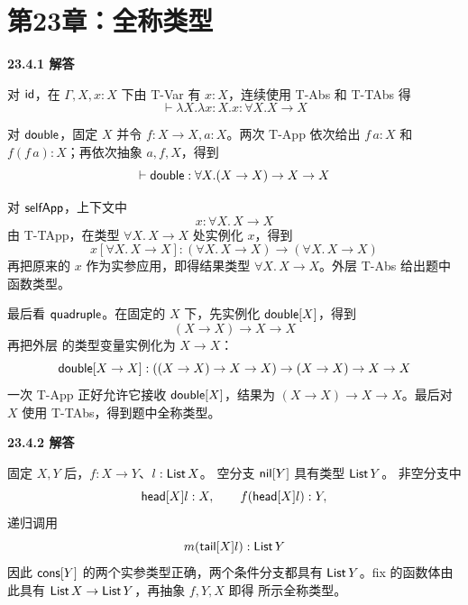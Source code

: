 \newpage
\section*{第23章：全称类型}

\begin{taplsolutionentrybox}
\label{sol:translator:23.4.1}
\textbf{23.4.1 解答}

对 \(\mathsf{id}\)，在 \(\Gamma,X,x:X\) 下由 T-Var 有
\(x:X\)，连续使用 T-Abs 和 T-TAbs 得
\[
\vdash\lambda X.\lambda x:X.x:\forall X.X\to X
\]

对 \(\mathsf{double}\)，固定 \(X\) 并令
\(f:X\to X,a:X\)。两次 T-App 依次给出
\(f\,a:X\) 和 \(f(f\,a):X\)；再依次抽象 \(a,f,X\)，得到
\[
\vdash\mathsf{double}:
\forall X.(X\to X)\to X\to X
\]

对 \(\mathsf{selfApp}\)，上下文中
\[
x:\forall X.\,X\to X
\]
由 T-TApp，在类型 \(\forall X.\,X\to X\) 处实例化 \(x\)，得到
\[
x[\forall X.\,X\to X]:
(\forall X.\,X\to X)\to(\forall X.\,X\to X)
\]
再把原来的 \(x\) 作为实参应用，即得结果类型
\(\forall X.\,X\to X\)。外层 T-Abs 给出题中函数类型。

最后看 \(\mathsf{quadruple}\)。在固定的 \(X\) 下，先实例化
\(\mathsf{double}[X]\)，得到
\[
(X\to X)\to X\to X
\]
再把外层  的类型变量实例化为 \(X\to X\)：
\[
\mathsf{double}[X\to X]:
((X\to X)\to X\to X)\to(X\to X)\to X\to X
\]
一次 T-App 正好允许它接收 \(\mathsf{double}[X]\)，结果为
\((X\to X)\to X\to X\)。最后对 \(X\) 使用 T-TAbs，得到题中全称类型。
\end{taplsolutionentrybox}

\begin{taplsolutionentrybox}
\label{sol:translator:23.4.2}
\textbf{23.4.2 解答}

固定 \(X,Y\) 后，\(f:X\to Y\)、\(l:\mathsf{List}\,X\)。
空分支 \(\mathsf{nil}[Y]\) 具有类型 \(\mathsf{List}\,Y\)。
非空分支中
\[
\mathsf{head}[X]l:X,\qquad
f(\mathsf{head}[X]l):Y,
\]
递归调用
\[
m(\mathsf{tail}[X]l):\mathsf{List}\,Y
\]
因此 \(\mathsf{cons}[Y]\) 的两个实参类型正确，两个条件分支都具有
\(\mathsf{List}\,Y\)。fix 的函数体由此具有
\(\mathsf{List}\,X\to\mathsf{List}\,Y\)，再抽象 \(f,Y,X\) 即得
所示全称类型。
\end{taplsolutionentrybox}

